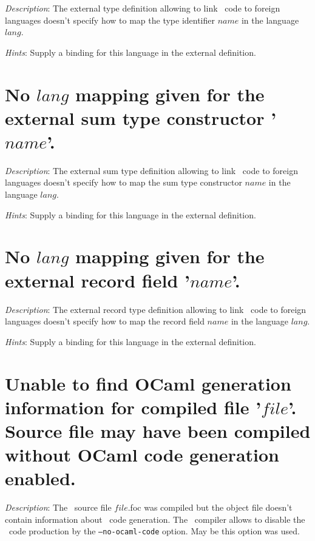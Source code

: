 {\em Description}: The external type definition allowing to link
\focal\ code to foreign languages doesn't specify how to map the type
identifier $name$ in the language $lang$.

{\em Hints}: Supply a binding for this language in the external
definition.



\section*{No $lang$ mapping given for the external sum type
  constructor '$name$'.}

{\em Description}: The external sum type definition allowing to link
\focal\ code to foreign languages doesn't specify how to map the sum
type constructor $name$ in the language $lang$.

{\em Hints}: Supply a binding for this language in the external
definition.



\section*{No $lang$ mapping given for the external record field
  '$name$'.}

{\em Description}: The external record type definition allowing to
link \focal\ code to foreign languages doesn't specify how to map the
record field $name$ in the language $lang$.

{\em Hints}: Supply a binding for this language in the external
definition.



\section*{Unable to find OCaml generation information for compiled
  file '$file$'. Source file may have been compiled without OCaml code
  generation enabled.}

{\em Description}: The \focal\ source file $file$.foc was compiled but
the object file doesn't contain information about \ocaml\ code
generation. The \focal\ compiler allows to disable the \ocaml\ code
production by the {\tt --no-ocaml-code} option. May be this option was used.

